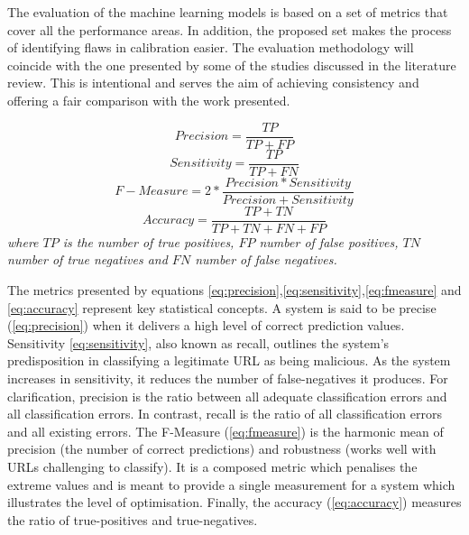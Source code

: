 The evaluation of the machine learning models is based on a set of metrics that cover all the performance areas. In addition, the proposed set makes the process of identifying flaws in calibration easier. The evaluation methodology will coincide with the one presented by some of the studies discussed in the literature review. This is intentional and serves the aim of achieving consistency and offering a fair comparison with the work presented.\newline


\begin{equation}
	\label{eq:precision}
	Precision = \frac{TP}{TP+FP}
\end{equation}
\begin{equation}
	\label{eq:sensitivity}
	Sensitivity = \frac{TP}{TP+FN}
\end{equation}
\begin{equation}
	\label{eq:fmeasure}
	F-Measure = 2*\frac{Precision * Sensitivity}{Precision + Sensitivity}
\end{equation}
\begin{equation}
	\label{eq:accuracy}
	Accuracy = \frac{TP+TN}{TP+TN+FN+FP}
\end{equation}
\newline
\textit{where $TP$ is the number of true positives, $FP$ number of false positives, $TN$ number of true negatives and $FN$ number of false negatives.}

The metrics presented by equations \ref{eq:precision},\ref{eq:sensitivity},\ref{eq:fmeasure} and \ref{eq:accuracy} represent key statistical concepts. A system is said to be precise (\ref{eq:precision}) when it delivers a high level of correct prediction values. Sensitivity \ref{eq:sensitivity}, also known as recall, outlines the system's predisposition in classifying a legitimate URL as being malicious. As the system increases in sensitivity, it reduces the number of false-negatives it produces. For clarification, precision is the ratio between all adequate classification errors and all classification errors. In contrast, recall is the ratio of all classification errors and all existing errors.
The F-Measure (\ref{eq:fmeasure}) is the harmonic mean of precision (the number of correct predictions) and robustness (works well with URLs challenging to classify). It is a composed metric which penalises the extreme values and is meant to provide a single measurement for a system which illustrates the level of optimisation. Finally, the accuracy (\ref{eq:accuracy}) measures the ratio of true-positives and true-negatives.


